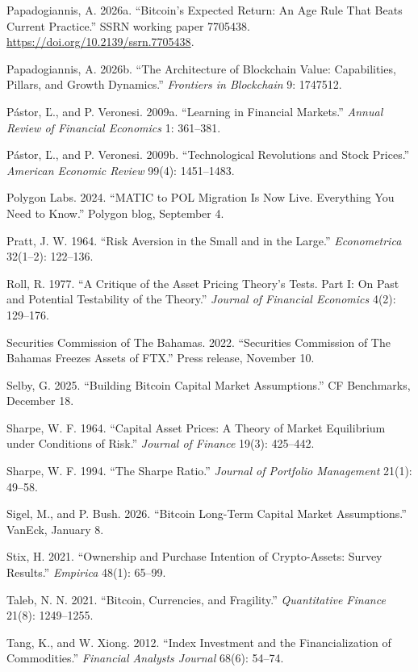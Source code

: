\documentclass[11pt]{article}
\begin{document}
\begin{list}{}{\setlength{\itemindent}{-1.5em}\setlength{\leftmargin}{1.5em}\setlength{\itemsep}{2pt}\setlength{\parsep}{0pt}}
\item Papadogiannis, A. 2026a. ``Bitcoin's Expected Return: An Age Rule That Beats Current Practice.'' SSRN working paper 7705438. \url{https://doi.org/10.2139/ssrn.7705438}.
\item Papadogiannis, A. 2026b. ``The Architecture of Blockchain Value: Capabilities, Pillars, and Growth Dynamics.'' \emph{Frontiers in Blockchain} 9: 1747512.
\item P\'astor, \v{L}., and P. Veronesi. 2009a. ``Learning in Financial Markets.'' \emph{Annual Review of Financial Economics} 1: 361--381.
\item P\'astor, \v{L}., and P. Veronesi. 2009b. ``Technological Revolutions and Stock Prices.'' \emph{American Economic Review} 99(4): 1451--1483.
\item Polygon Labs. 2024. ``MATIC to POL Migration Is Now Live. Everything You Need to Know.'' Polygon blog, September 4.
\item Pratt, J. W. 1964. ``Risk Aversion in the Small and in the Large.'' \emph{Econometrica} 32(1--2): 122--136.
\item Roll, R. 1977. ``A Critique of the Asset Pricing Theory's Tests. Part I: On Past and Potential Testability of the Theory.'' \emph{Journal of Financial Economics} 4(2): 129--176.
\item Securities Commission of The Bahamas. 2022. ``Securities Commission of The Bahamas Freezes Assets of FTX.'' Press release, November 10.
\item Selby, G. 2025. ``Building Bitcoin Capital Market Assumptions.'' CF Benchmarks, December 18.
\item Sharpe, W. F. 1964. ``Capital Asset Prices: A Theory of Market Equilibrium under Conditions of Risk.'' \emph{Journal of Finance} 19(3): 425--442.
\item Sharpe, W. F. 1994. ``The Sharpe Ratio.'' \emph{Journal of Portfolio Management} 21(1): 49--58.
\item Sigel, M., and P. Bush. 2026. ``Bitcoin Long-Term Capital Market Assumptions.'' VanEck, January 8.
\item Stix, H. 2021. ``Ownership and Purchase Intention of Crypto-Assets: Survey Results.'' \emph{Empirica} 48(1): 65--99.
\item Taleb, N. N. 2021. ``Bitcoin, Currencies, and Fragility.'' \emph{Quantitative Finance} 21(8): 1249--1255.
\item Tang, K., and W. Xiong. 2012. ``Index Investment and the Financialization of Commodities.'' \emph{Financial Analysts Journal} 68(6): 54--74.

\end{list}
\end{document}
